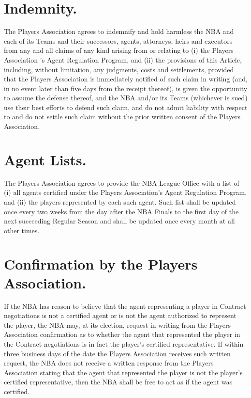 \documentclass[
]{book}
\begin{document}
\hypertarget{indemnity.}{%
\section{Indemnity.}\label{indemnity.}}

The Players Association agrees to indemnify and hold harmless the NBA and each of its Teams and their successors, agents, attorneys, heirs and executors from any and all claims of any kind arising from or relating to (i) the Players Association 's Agent Regulation Program, and (ii) the provisions of this Article, including, without limitation, any judgments, costs and settlements, provided that the Players Association is immediately notified of such claim in writing (and, in no event later than five days from the receipt thereof), is given the opportunity to assume the defense thereof, and the NBA and/or its Teams (whichever is sued) use their best efforts to defend such claim, and do not admit liability with respect to and do not settle such claim without the prior written consent of the Players Association.

\hypertarget{agent-lists.}{%
\section{Agent Lists.}\label{agent-lists.}}

The Players Association agrees to provide the NBA League Office with a list of (i) all agents certified under the Players Association's Agent Regulation Program, and (ii) the players represented by each such agent. Such list shall be updated once every two weeks from the day after the NBA Finals to the first day of the next succeeding Regular Season and shall be updated once every month at all other times.

\hypertarget{confirmation-by-the-players-association.}{%
\section{Confirmation by the Players Association.}\label{confirmation-by-the-players-association.}}

If the NBA has reason to believe that the agent representing a player in Contract negotiations is not a certified agent or is not the agent authorized to represent the player, the NBA may, at its election, request in writing from the Players Association confirmation as to whether the agent that represented the player in the Contract negotiations is in fact the player's certified representative. If within three business days of the date the Players Association receives such written request, the NBA does not receive a written response from the Players Association stating that the agent that represented the player is not the player's certified representative, then the NBA shall be free to act as if the agent was certified.
\end{document}
